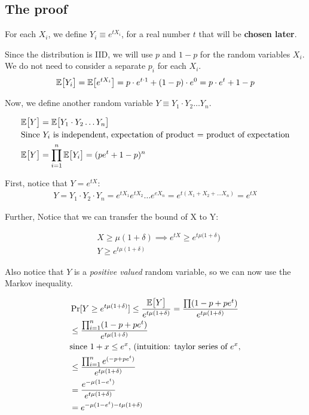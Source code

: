 \subsection{The proof}
For each $X_i$, we define $Y_i \equiv e^{t X_i}$, for a real number $t$
that will be \textbf{chosen later}.


Since the distribution is IID, we will use $p$ and $1 - p$ for the random
variables $X_i$. We do not need to consider a separate $p_i$ for each $X_i$.
\begin{align*}
\mathbb{E}\big[ Y_i \big] = \mathbb{E}\big[ e^{t X_i}  \big] = p \cdot e^{t \cdot 1} + (1 - p) \cdot e^0 =
p \cdot e^t + 1 - p
\end{align*}


Now, we define another random variable $Y \equiv Y_1 \cdot Y_2 \dots Y_n$.

\begin{align*}
&\mathbb{E}\big[ Y \big] = \mathbb{E}\big[ Y_1 \cdot Y_2 \dots Y_n \big]  \\
&\text{Since $Y_i$ is independent, expectation of product = product of expectation} \\
&\mathbb{E}\big[ Y \big] = \prod_{i=1}^n \mathbb{E}\big[ Y_i \big] = (p e^t + 1 - p)^n
\end{align*}

First, notice that $Y = e^{tX}$:
\begin{align*}
Y = Y_1 \cdot Y_2 \cdot Y_n = e^{tX_1} e^{t X_2} \dots e^{e X_n} = e^{t(X_1 + X_2 + \dots X_n)} = e^{tX}
\end{align*}

Further, Notice that we can transfer the bound of X to Y:

\begin{align*}
&X \geq \mu(1 + \delta) \implies e^{tX} \geq e^{t \mu(1 + \delta}) \\
&Y \geq e^{t \mu (1 + \delta)}
\end{align*}

Also notice that $Y$ is a \textit{positive valued} random variable, so we can
now use the Markov inequality.

\begin{align*}
&\Pr[Y \geq e^{t \mu (1 + \delta)}] \leq \frac{\E{Y}}{e^{t \mu (1 + \delta)}} = 
\frac{\prod (1 - p + pe^t)}{e^{t \mu (1 + \delta)}} \\
%
&\leq \frac{\prod_{i=1}^n (1 - p + pe^t)}{e^{t \mu (1 + \delta)}} \\
%
&\text{since $1 + x \leq e^x$, (intuition: taylor series of $e^x$}, \\
%
&\leq \frac{\prod_{i=1}^n e^{(- p + pe^t)}}{e^{t \mu (1 + \delta)}} \\
%
&= \frac{e^{-\mu (1 - e^t)}}{e^{t \mu (1 + \delta)}} \\
%
&= e^{-\mu (1 - e^t) - t\mu(1 + \delta)} \\
%
\end{align*}



